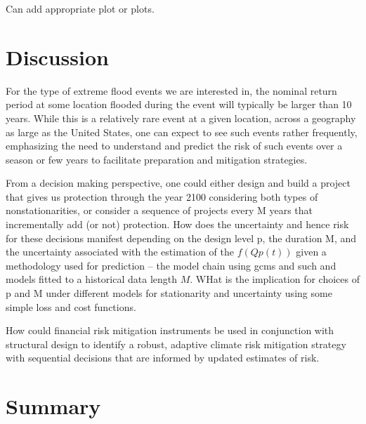 \documentclass[11pt]{article}
\begin{document}
Can add appropriate plot or plots.

\section{Discussion}

For the type of extreme flood events we are interested in, the nominal return period at some location flooded during the event will typically be larger than 10 years.
While this is a relatively rare event at a given location, across a geography as large as the United States, one can expect to see such events rather frequently, emphasizing the need to understand and predict the risk of such events over a season or few years to facilitate preparation and mitigation strategies.

From a decision making perspective, one could either design and build a project that gives us protection through the year 2100 considering both types of nonstationarities, or consider a sequence of projects every M years that incrementally add (or not) protection. How does the uncertainty and hence risk for these decisions manifest depending on the design level p, the duration M, and the uncertainty associated with the estimation of the \( f(Qp(t)) \) given a methodology used for prediction -- \eg{} the model chain using gcms and such and models fitted to a historical data length \(M\).
WHat is the implication for choices of p and M under different models for stationarity and uncertainty using some simple loss and cost  functions.

How could  financial risk mitigation instruments be used in conjunction with structural design to identify a robust, adaptive climate risk mitigation strategy with sequential decisions that are informed by updated estimates of risk.


\section{Summary}
\end{document}
